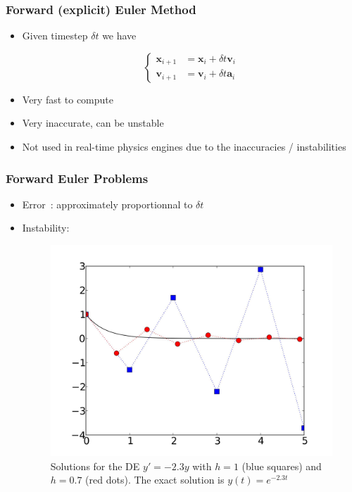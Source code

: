 \documentclass{beamer}
\begin{document}
\begin{frame}
  \frametitle{Forward (explicit) Euler Method}

  \begin{itemize}
  \item Given timestep $\delta t$ we have

    $$
    \begin{cases}
      \mathbf{x}_{i+1} &= \mathbf{x}_i + \delta t \mathbf{v}_i\\
      \mathbf{v}_{i+1} &= \mathbf{v}_i + \delta t \mathbf{a}_i
    \end{cases}
    $$
    \pause
  \item Very fast to compute
    \pause
  \item Very inaccurate, can be unstable
  \item Not used in real-time physics engines due to the inaccuracies / instabilities
  \end{itemize}
\end{frame}



\begin{frame}
  \frametitle{Forward Euler Problems}

  \begin{itemize}
  \item Error~: approximately proportionnal to $\delta t$
    \pause
  \item Instability:~\\
    \begin{figure}[p]
      \centering
      \includegraphics[width=0.5\linewidth]{instability.jpg}
      \caption{Solutions for the DE $y' = -2.3y$ with $h=1$ (blue squares) and $h=0.7$ (red dots).
        The exact solution is $y(t) = e^{-2.3t}$}
    \end{figure}
  \end{itemize} 
\end{frame}
\end{document}
